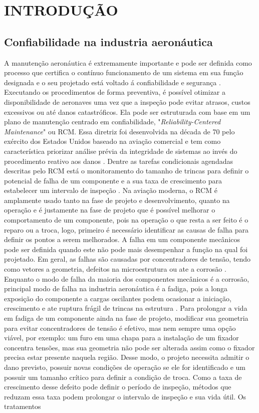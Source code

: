 \section{\MakeUppercase{Introdução}}
		
	\subsection{Confiabilidade na industria aeronáutica}
	A manutenção aeronáutica é extremamente importante e pode ser definida como processo que certifica o contínuo funcionamento de um sistema em sua função designada e o seu projetado está voltado á confiabilidade e segurança \cite[p. 35]{kinnison2013aviation}. Executando os procedimentos de forma preventiva, é possível otimizar a disponibilidade de aeronaves uma vez que a inspeção pode evitar atrasos, custos excessivos ou até danos catastróficos. Ela pode ser estruturada com base em um plano de manutenção centrado em confiabilidade, "\textit{Reliability-Centered Maintenance}" ou RCM. Essa diretriz foi desenvolvida na década de 70 pelo exército dos Estados Unidos baseado na aviação comercial e tem como característica priorizar análise prévia da integridade de sistemas ao invés do procedimento reativo aos danos \cite[p. 34]{kinnison2013aviation}. Dentre as tarefas condicionais agendadas descritas pelo RCM está o monitoramento do tamanho de trincas para definir o potencial de falha de um componente e a sua taxa de crescimento para estabelecer um intervalo de inspeção \cite[p. 52]{nowlan1978maintenance}. Na aviação moderna, o RCM é amplamente usado tanto na fase de projeto e desenvolvimento, quanto na operação \cite{ludek2005rcm} e é justamente na fase de projeto que é possível melhorar o comportamento de um componente, pois na operação o que resta a ser feito é o reparo ou a troca, logo, primeiro é necessário identificar as causas de falha para definir os pontos a serem melhorados. A falha em um componente mecânicos pode ser definida quando este não pode mais desempenhar a função na qual foi projetado. Em geral, as falhas são causadas por concentradores de tensão, tendo como vetores a geometria, defeitos na microestrutura ou ate a corrosão \cite{findlay2002aircraft}. Enquanto o modo de falha da maioria dos componentes mecânicos é a corrosão, principal modo de falha na industria aeronáutica é a fadiga, pois a longa exposição do componente a cargas oscilantes podem ocasionar a iniciação, crescimento e ate ruptura frágil de trincas na estrutura \cite{tavares2017overview}. Para prolongar a vida em fadiga de um componente ainda na fase de projeto, modificar sua geometria para evitar concentradores de tensão é efetivo, mas nem sempre uma opção viável, por exemplo: um furo em uma chapa para a instalação de um fixador concentra tensões, mas sua geometria não pode ser alterada assim como o fixador precisa estar presente naquela região. Desse modo, o projeto necessita admitir o dano previsto, possuir novas condições de operação se ele for identificado e um possuir um tamanho crítico para definir a condição de troca. Como a taxa de crescimento desse defeito pode definir o período de inspeção, métodos que reduzam essa taxa podem prolongar o intervalo de inspeção e sua vida útil. Os tratamentos 